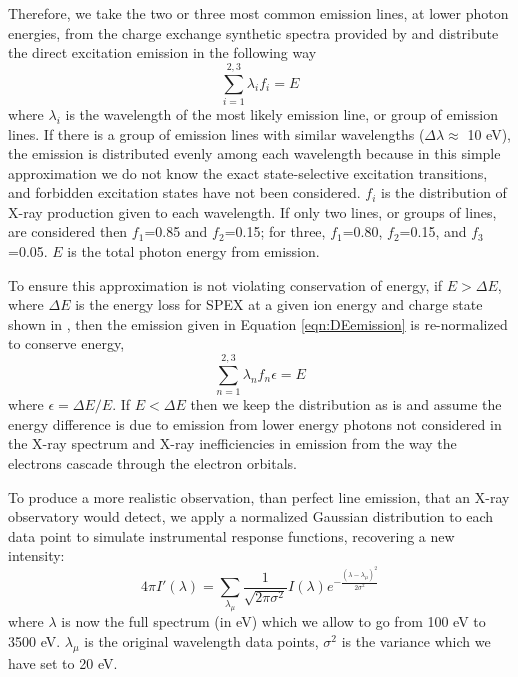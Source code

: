 \documentclass[draft]{agujournal2018}
\begin{document}
Therefore, we take the two or three most common emission lines, at lower photon energies, from the charge exchange synthetic spectra provided by \citet{hui2010} and distribute the direct excitation emission in the following way
\begin{equation}
    \sum_{i=1}^{2,3}\lambda_{i}f_{i}=E
    \label{eqn:DEemission}
\end{equation}
where $\lambda_{i}$ is the wavelength of the most likely emission line, or group of emission lines.
If there is a group of emission lines with similar wavelengths ($\Delta\lambda\approx$ 10 eV), the emission is distributed evenly among each wavelength because in this simple approximation we do not know the exact state-selective excitation transitions, and forbidden excitation states have not been considered.
$f_{i}$ is the distribution of X-ray production given to each wavelength.
If only two lines, or groups of lines, are considered then $f_{1}$=0.85 and $f_{2}$=0.15; for three, $f_{1}$=0.80, $f_{2}$=0.15, and $f_{3}$=0.05.
$E$ is the total photon energy from emission.

To ensure this approximation is not violating conservation of energy, if $E>\Delta E$, where $\Delta E$ is the energy loss for SPEX at a given ion energy and charge state shown in \citet{schultz2018}, then the emission given in Equation \ref{eqn:DEemission} is re-normalized to conserve energy,
\begin{equation}
    \sum_{n=1}^{2,3}\lambda_{n}f_{n}\epsilon=E
\end{equation}
where $\epsilon=\Delta E/E$.
If $E<\Delta E$ then we keep the distribution as is and assume the energy difference is due to emission from lower energy photons not considered in the X-ray spectrum and X-ray inefficiencies in emission from the way the electrons cascade through the electron orbitals.

To produce a more realistic observation, than perfect line emission, that an X-ray observatory would detect, we apply a normalized Gaussian distribution to each data point to simulate instrumental response functions, recovering a new intensity:
\begin{equation}
    4\pi I'(\lambda)=\sum_{\lambda_{\mu}}\frac{1}{\sqrt{2\pi\sigma^2}}I(\lambda)e^{-\frac{(\lambda-\lambda_{\mu})^2}{2\sigma^2}}
\end{equation}
where $\lambda$ is now the full spectrum (in eV) which we allow to go from 100 eV to 3500 eV. $\lambda_{\mu}$ is the original wavelength data points, $\sigma^2$ is the variance which we have set to 20 eV.
\end{document}
